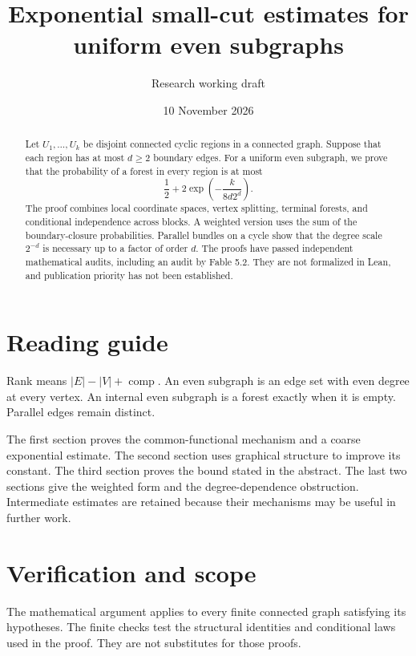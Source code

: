 \documentclass[11pt]{article}
\title{Exponential small-cut estimates for uniform even subgraphs}
\author{Research working draft}
\date{10 November 2026}
\begin{document}
\maketitle
\begin{abstract}
Let $U_1,\ldots,U_k$ be disjoint connected cyclic regions in a connected graph.
Suppose that each region has at most $d\ge2$ boundary edges.
For a uniform even subgraph, we prove that the probability of a forest in every region is at most
\[
 \frac12+2\exp\!\left(-\frac{k}{8d2^d}\right).
\]
The proof combines local coordinate spaces, vertex splitting, terminal forests, and conditional independence across blocks.
A weighted version uses the sum of the boundary-closure probabilities.
Parallel bundles on a cycle show that the degree scale $2^{-d}$ is necessary up to a factor of order $d$.
The proofs have passed independent mathematical audits, including an audit by Fable 5.2.
They are not formalized in Lean, and publication priority has not been established.
\end{abstract}

\section*{Reading guide}
Rank means $|E|-|V|+\operatorname{comp}$.
An even subgraph is an edge set with even degree at every vertex.
An internal even subgraph is a forest exactly when it is empty.
Parallel edges remain distinct.

The first section proves the common-functional mechanism and a coarse exponential estimate.
The second section uses graphical structure to improve its constant.
The third section proves the bound stated in the abstract.
The last two sections give the weighted form and the degree-dependence obstruction.
Intermediate estimates are retained because their mechanisms may be useful in further work.

\tableofcontents






\section{Verification and scope}
The mathematical argument applies to every finite connected graph satisfying its hypotheses.
The finite checks test the structural identities and conditional laws used in the proof.
They are not substitutes for those proofs.
\end{document}
